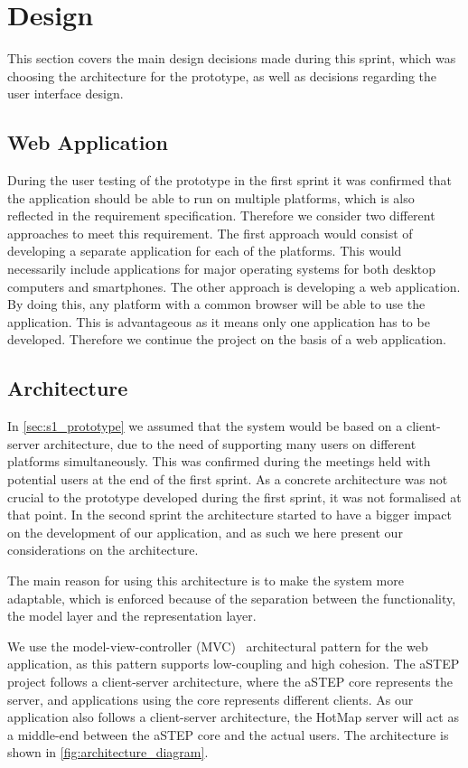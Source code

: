 \section{Design} \label{sec:s2_design}
This section covers the main design decisions made during this sprint, which was choosing the architecture for the prototype, as well as decisions regarding the user interface design.

\subsection{Web Application}
During the user testing of the prototype in the first sprint it was confirmed that the application should be able to run on multiple platforms, which is also reflected in the requirement specification. Therefore we consider two different approaches to meet this requirement. The first approach would consist of developing a separate application for each of the platforms. This would necessarily include applications for major operating systems for both desktop computers and smartphones. The other approach is developing a web application. By doing this, any platform with a common browser will be able to use the application. This is advantageous as it means only one application has to be developed. Therefore we continue the project on the basis of a web application. 

\subsection{Architecture} \label{sec:s2_architecture}
In \cref{sec:s1_prototype} we assumed that the system would be based on a client-server architecture, due to the need of supporting many users on different platforms simultaneously. This was confirmed during the meetings held with potential users at the end of the first sprint. As a concrete architecture was not crucial to the prototype developed during the first sprint, it was not formalised at that point. In the second sprint the architecture started to have a bigger impact on the development of our application, and as such we here present our considerations on the architecture.

The main reason for using this architecture is to make the system more adaptable, which is enforced because of the separation between the functionality, the model layer and the representation layer.

We use the model-view-controller (MVC)~\cite{website:MVC} architectural pattern for the web application, as this pattern supports low-coupling and high cohesion. The aSTEP project follows a client-server architecture, where the aSTEP core represents the server, and applications using the core represents different clients. As our application also follows a client-server architecture, the HotMap server will act as a middle-end between the aSTEP core and the actual users. The architecture is shown in \cref{fig:architecture_diagram}.

